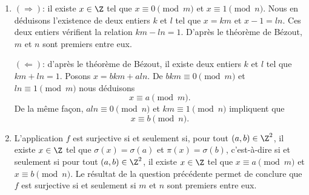 \begin{enumerate}
  \item 
    $(\Rightarrow)$: il existe $x\in\Z$ tel que $x\equiv 0\pmod{m}$ et 
    $x\equiv 1\pmod{n}$. Nous en déduisons l'existence de deux entiers $k$ et
    $l$ tel que $x = km$ et $x - 1 = ln$. Ces deux entiers vérifient la relation
    $km - ln = 1$. D'après le théorème de Bézout, $m$ et $n$ sont premiers entre
    eux.

    $(\Leftarrow)$: d'après le théorème de Bézout, il existe deux entiers $k$ et
    $l$ tel que $km + ln = 1$. Posons $x = bkm + aln$. 
    De $bkm \equiv 0 \pmod{m}$ et $ln \equiv 1\pmod{m}$ nous déduisons
    \[
      x\equiv a\pmod{m}.
    \]
    De la même façon, $aln \equiv 0 \pmod{n}$ et $km\equiv 1\pmod{n}$ impliquent
    que
    \[
      x\equiv b\pmod{n}.
    \]

  \item
    L'application $f$ est surjective si et seulement si, pour tout
    $(a,b)\in\Z^2$, il existe $x\in\Z$ tel que 
    $\sigma(x)=\sigma(a)$ et $\pi(x)=\sigma(b)$, c'est-à-dire si et seulement si pour
    tout $(a,b)\in\Z^2$, il existe $x\in\Z$ tel que $x\equiv a\pmod{m}$ et
    $x\equiv b\pmod{n}$. Le résultat de la question précédente permet de
    conclure que $f$ est surjective si et seulement si $m$ et $n$ sont premiers
    entre eux.
\end{enumerate}

